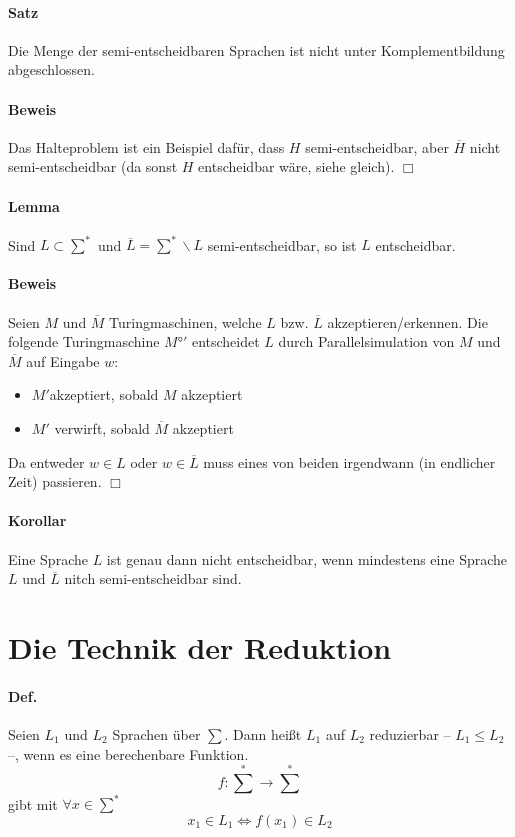 \paragraph*{Satz} Die Menge der semi-entscheidbaren Sprachen ist nicht unter Komplementbildung abgeschlossen.

\paragraph*{Beweis} Das Halteproblem ist ein Beispiel dafür, dass $H$ semi-entscheidbar, aber $\overline{H}$ nicht semi-entscheidbar (da sonst $H$ entscheidbar wäre, siehe gleich). $\Box$

\paragraph{Lemma} Sind $L \subset \sum^*$ und $\overline{L}=\sum^*\backslash L$ semi-entscheidbar, so ist $L$ entscheidbar.

\paragraph*{Beweis} Seien $M$ und $\overline{M}$ Turingmaschinen, welche $L$ bzw. $\overline{L}$ akzeptieren/erkennen. Die folgende Turingmaschine $M°'$ entscheidet $L$ durch Parallelsimulation von $M$ und $\overline{M}$ auf Eingabe $w$:
\begin{itemize}
	\item $M'$akzeptiert, sobald $M$ akzeptiert
	\item $M'$ verwirft, sobald $\overline{M}$ akzeptiert
\end{itemize}
Da entweder $w\in L$ oder $w\in \overline{L}$ muss eines von beiden irgendwann (in endlicher Zeit) passieren. $\Box$

\paragraph*{Korollar} Eine Sprache $L$ ist genau dann nicht entscheidbar, wenn mindestens eine Sprache $L$ und $\overline{L}$ nitch semi-entscheidbar sind.


\section{Die Technik der Reduktion}

\paragraph*{Def.} Seien $L_1$ und $L_2$ Sprachen über $\sum$. Dann heißt $L_1$ auf $L_2$ reduzierbar -- $L_1 \leq L_2$ --, wenn es eine berechenbare Funktion. $$ f: \sum^* \rightarrow \sum^* $$ gibt mit $\forall x \in \sum^*$ $$ x_1 \in L_1 \Leftrightarrow f(x_1) \in L_2 $$


